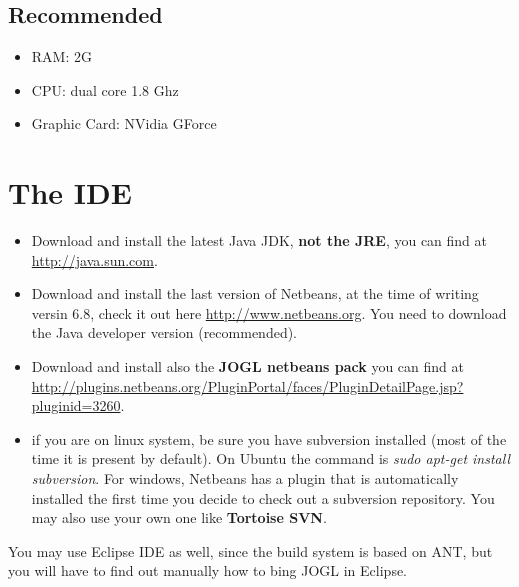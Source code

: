 \documentclass[12pt,a4paper,final,makeidx]{report}
\begin{document}
\subsection{Recommended}
\begin{itemize}
\item RAM: 2G
\item CPU: dual core 1.8 Ghz
\item Graphic Card: NVidia GForce
\end{itemize}

\section{The IDE}
\begin{itemize}
\item Download and install the latest Java JDK, \textbf{not the JRE}, you can find at \url{http://java.sun.com}.
\item Download and install the last version of Netbeans, at the time of writing versin 6.8, check it out here \url{http://www.netbeans.org}.
You need to download the Java developer version (recommended).
\item Download and install also the \textbf{JOGL netbeans pack} you can find at \url{http://plugins.netbeans.org/PluginPortal/faces/PluginDetailPage.jsp?pluginid=3260}.
\item if you are on linux system, be sure you have subversion installed (most of the time it is present by default).
On Ubuntu the command is \textit{sudo apt-get install subversion}.
For windows, Netbeans has a plugin that is automatically installed the first time you decide to check out a subversion repository.
You may also use your own one like \textbf{Tortoise SVN}.
\end{itemize}
You may use Eclipse IDE as well, since the build system is based on ANT, but you will have to find out manually how to bing JOGL in Eclipse.
\end{document}
